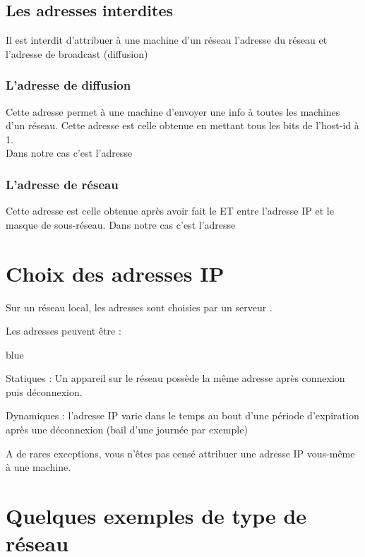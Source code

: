 \subsection{Les adresses interdites}

Il est interdit d’attribuer à une machine d’un réseau l’adresse du réseau et l’adresse de broadcast (diffusion)

\subsubsection{L'adresse de diffusion}

Cette adresse permet à une machine d’envoyer une info à toutes les machines d’un réseau. 
Cette adresse est celle obtenue en mettant tous les bits de l’host-id à 1. \\
Dans notre cas c'est l'adresse 

\subsubsection{L'adresse de réseau}

Cette adresse est celle obtenue après avoir fait le ET entre l'adresse IP et le masque de sous-réseau.
Dans notre cas c'est l'adresse 


\section{Choix des adresses IP}


Sur un réseau local, les adresses sont choisies par un serveur .

Les adresses peuvent être :

\begin{items}{blue}{\Bullet}
	\item Statiques : Un appareil sur le réseau possède la même adresse après connexion puis déconnexion.
	\item Dynamiques : l'adresse IP varie dans le temps au bout d'une période d'expiration après une déconnexion 
	(bail d'une journée par exemple)
\end{items}

A de rares exceptions, vous n'êtes pas censé attribuer une adresse IP vous-même à une machine.\\


\section{Quelques exemples de type de réseau}

